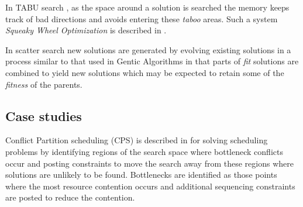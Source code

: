 \documentclass[12pt,a4paper]{article}
\begin{document}
\begin{description}
In TABU search \citep{glover99tabu}, as the space around a solution is searched the memory keeps track of bad directions and avoids entering these \emph{taboo} areas. Such a system \emph{Squeaky Wheel Optimization} is described in \citep{joslin99squeaky} .  

In scatter search new solutions are generated by evolving existing solutions in a process similar to that used in Gentic Algorithms in that parts of \emph{fit} solutions are combined to yield new solutions which may be expected to retain some of the \emph{fitness} of the parents. 

\end{description}

\subsection{Case studies}
\label{subsect:casestudy}
Conflict Partition scheduling (CPS) is described in \citep{muscettola92bottleneck} for solving scheduling problems by identifying regions of the search space where bottleneck conflicts occur and posting constraints to move the search away from these regions where solutions are unlikely to be found. Bottlenecks are identified as those points where the most resource contention occurs and additional sequencing constraints are posted to reduce the contention. 
\end{document}
